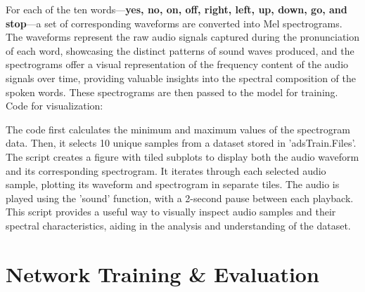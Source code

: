 \documentclass[a4paper]{report}
\begin{document}
{\hspace{-1.5cm}

For each of the ten words—\textbf{yes, no, on, off, right, left, up, down, go, and stop}—a set of corresponding waveforms are converted into Mel spectrograms. The waveforms represent the raw audio signals captured during the pronunciation of each word, showcasing the distinct patterns of sound waves produced, and the spectrograms offer a visual representation of the frequency content of the audio signals over time, providing valuable insights into the spectral composition of the spoken words. These spectrograms are then passed to the model for training.
\newpage
Code for visualization:
\begin{center}
\end{center}
The code first calculates the minimum and maximum values of the spectrogram data. Then, it selects 10 unique samples from a dataset stored in 'adsTrain.Files'. The script creates a figure with tiled subplots to display both the audio waveform and its corresponding spectrogram. It iterates through each selected audio sample, plotting its waveform and spectrogram in separate tiles. The audio is played using the 'sound' function, with a 2-second pause between each playback. This script provides a useful way to visually inspect audio samples and their spectral characteristics, aiding in the analysis and understanding of the dataset.
\section{Network Training \& Evaluation}
}
\end{document}
